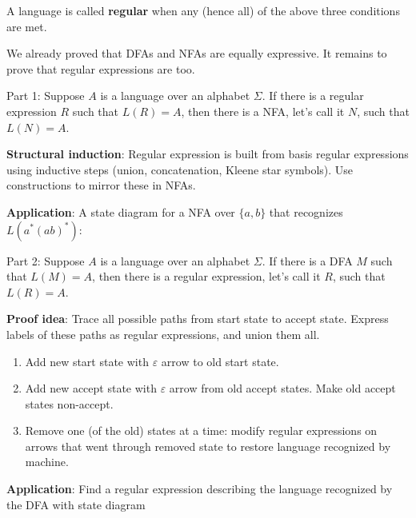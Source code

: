 \documentclass[12pt, oneside]{article}
\begin{document}
A language is called {\bf regular} when any (hence all) of the above three conditions are met.

We already proved that DFAs and NFAs are equally expressive. It remains to prove that regular expressions 
are too.

Part 1: Suppose $A$ is a language over an alphabet $\Sigma$.
If there is a regular expression $R$ such that $L(R) = A$, then there is a NFA, let's call it $N$, such that 
$L(N) = A$.

{\bf Structural induction}: Regular expression is built from basis regular expressions using inductive steps
(union, concatenation, Kleene star symbols). Use constructions to mirror these in NFAs.


{\bf Application}: A state diagram for a NFA over $\{a,b\}$ that recognizes $L(a^* (ab)^*)$:

\vfill

Part 2: Suppose $A$ is a language over an alphabet $\Sigma$.
If there is a DFA $M$ such that $L(M) = A$, then there is a regular expression, let's call it $R$, such that 
$L(R) = A$.

{\bf Proof idea}: Trace all possible paths from start state to accept state.  Express labels of these paths
as regular expressions, and union them all.

\begin{enumerate}
\item Add new start state with $\varepsilon$ arrow to old start state.
\item Add new accept state with $\varepsilon$ arrow from old accept states.  Make old accept states
non-accept.
\item Remove one (of the old) states at a time: modify regular expressions on arrows that went through removed
state to restore language recognized by machine.
\end{enumerate}

{\bf Application}: Find a regular expression describing the language recognized by the DFA with 
state diagram

\end{document}
